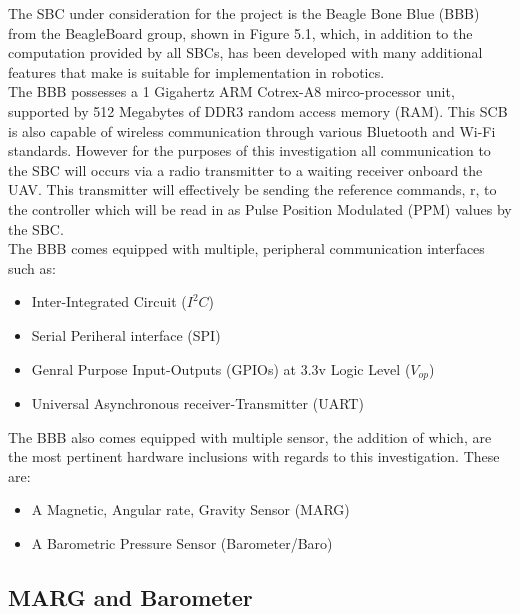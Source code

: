 \documentclass[12pt,a4paper,twoside]{report}
\begin{document}
			The SBC under consideration for the project is the Beagle Bone Blue (BBB) from the BeagleBoard group, shown in Figure 5.1, which, in addition to the computation provided by all SBCs, has been developed with many additional features that make is suitable for implementation in robotics.
			\\
			The BBB possesses a 1 Gigahertz ARM Cotrex-A8 mirco-processor unit, supported by 512 Megabytes of DDR3 random access memory (RAM). This SCB is also capable of wireless communication through various Bluetooth and Wi-Fi standards. However for the purposes of this investigation all communication to the SBC will occurs via a radio transmitter to a waiting receiver onboard the UAV. This transmitter will effectively be sending the reference commands, r, to the controller which will be read in as Pulse Position Modulated (PPM) values by the SBC. 
			\\
			The BBB comes equipped with multiple, peripheral communication interfaces such as:
			\\
			\begin{itemize}
				\item
					Inter-Integrated Circuit ($I^{2}C$)
				\item
					Serial Periheral interface (SPI)
				\item
					 Genral Purpose Input-Outputs (GPIOs) at 3.3v Logic Level ($V_{op}$)
				\item
					Universal Asynchronous receiver-Transmitter (UART) 
			\end{itemize}  
			
			The BBB also comes equipped with multiple sensor, the addition of which, are the most pertinent hardware inclusions with regards to this investigation. These are:
			\\
			\begin{itemize}
				\item
					A Magnetic, Angular rate, Gravity Sensor (MARG)
				\item
					A Barometric Pressure Sensor (Barometer/Baro)
			\end{itemize}  
			
			\subsection{MARG and Barometer}
			
\end{document}
